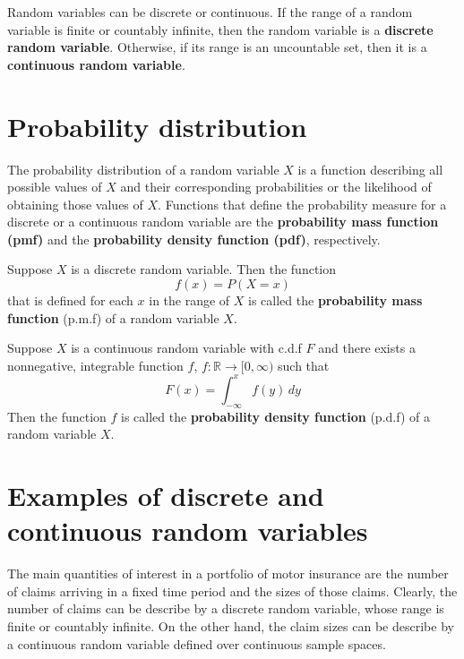 \documentclass[
]{book}
\theoremstyle{definition}
\theoremstyle{definition}
\theoremstyle{definition}
\theoremstyle{definition}
\theoremstyle{remark}
\begin{document}
Random variables can be discrete or continuous. If the range of a random
variable is finite or countably infinite, then the random variable is a
\textbf{discrete random variable}. Otherwise, if its range is an uncountable
set, then it is a \textbf{continuous random variable}.

\hypertarget{probability-distribution}{%
\section{Probability distribution}\label{probability-distribution}}

The probability distribution of a random variable \(X\) is a function
describing all possible values of \(X\) and their corresponding
probabilities or the likelihood of obtaining those values of \(X\).
Functions that define the probability measure for a discrete or a
continuous random variable are the \textbf{probability mass function (pmf)}
and the \textbf{probability density function (pdf)}, respectively.

Suppose \(X\) is a discrete random variable. Then the function
\[f(x) = P(X = x)\] that is defined for each \(x\) in the range of \(X\) is
called the \textbf{probability mass function} (p.m.f) of a random variable
\(X\).

Suppose \(X\) is a continuous random variable with c.d.f \(F\) and there
exists a nonnegative, integrable function \(f\),
\(f: \mathbb{R} \rightarrow [0, \infty)\) such that
\[F(x) = \int_{-\infty}^x f(y)\, dy\] Then the function \(f\) is called
the \textbf{probability density function} (p.d.f) of a random variable \(X\).

\hypertarget{examples-of-discrete-and-continuous-random-variables}{%
\section*{Examples of discrete and continuous random variables}\label{examples-of-discrete-and-continuous-random-variables}}

The main quantities of interest in a portfolio of motor insurance are
the number of claims arriving in a fixed time period and the sizes of
those claims. Clearly, the number of claims can be describe by a
discrete random variable, whose range is finite or countably infinite.
On the other hand, the claim sizes can be describe by a continuous
random variable defined over continuous sample spaces.
\end{document}
